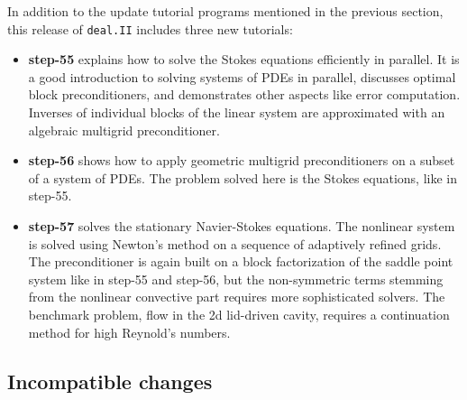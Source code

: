 \documentclass{ansarticle-preprint}
\newcommand{\specialword}[1]{\texttt{#1}}
\newcommand{\dealii}{{\specialword{deal.II}}}
\begin{document}
In addition to the update tutorial programs mentioned in the previous
section, this release of \dealii{} includes three new tutorials:
\begin{itemize}
 \item {\bf step-55} explains how to solve the Stokes 
 equations efficiently in parallel. It is a good introduction to solving
 systems of PDEs in parallel, discusses optimal block 
 preconditioners, and demonstrates other aspects like error computation.
 Inverses of individual blocks of the linear system are approximated with an algebraic 
 multigrid preconditioner.
 
 \item {\bf step-56} shows how to apply geometric multigrid
 preconditioners on a subset of a system of PDEs. The problem solved here is the 
 Stokes equations, like in step-55.
 
 \item {\bf step-57} solves the stationary Navier-Stokes equations.
 The nonlinear system is solved using Newton's method on a sequence of adaptively refined
 grids. The preconditioner is again built on a block factorization of the saddle point
 system like in step-55 and step-56, but the non-symmetric terms stemming from the
 nonlinear convective part requires more sophisticated solvers. The benchmark problem,
 flow in the 2d lid-driven cavity, requires a continuation method for high Reynold's 
 numbers.
 \end{itemize}


\subsection{Incompatible changes}
\end{document}
